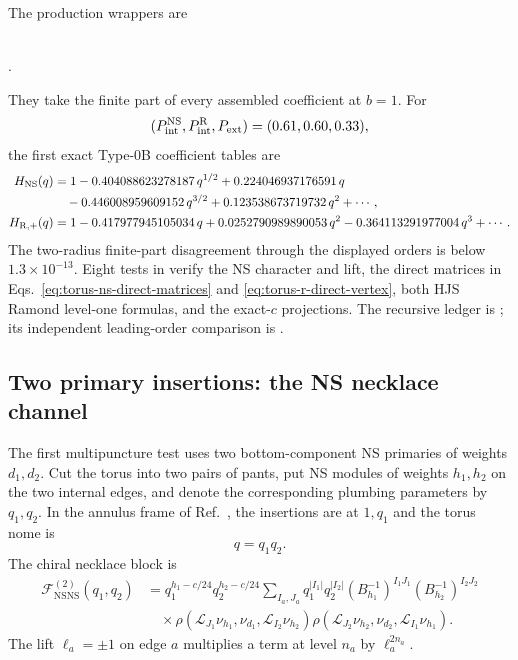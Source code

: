 \documentclass[11pt]{article}
\newcommand{\NS}{\mathrm{NS}}
\newcommand{\R}{\mathrm{R}}
\newcommand{\F}{\mathcal F}
\begin{document}
The production wrappers are
\begin{center}
\\
.
\end{center}
They take the finite part of every assembled coefficient at $b=1$.  For
\begin{equation}
 (P_{\rm int}^{\NS},P_{\rm int}^{\R},P_{\rm ext})
 =(0.61,0.60,0.33),
 \label{eq:torus-code-anchor-momenta}
\end{equation}
the first exact Type-0B coefficient tables are
\begin{align}
 H_{\NS}(q)
 &=1-0.404088623278187\,q^{1/2}
   +0.224046937176591\,q
 \notag\\
 &\quad
   -0.446008959609152\,q^{3/2}
   +0.123538673719732\,q^2+\cdots,
 \notag\\
 H_{\R,+}(q)
 &=1-0.417977945105034\,q
   +0.0252790989890053\,q^2
   -0.364113291977004\,q^3+\cdots .
 \label{eq:torus-code-anchors}
\end{align}
The two-radius finite-part disagreement through the displayed orders is
below $1.3\times10^{-13}$.  Eight tests in
 verify the NS character and lift,
the direct matrices in Eqs.~\eqref{eq:torus-ns-direct-matrices} and
\eqref{eq:torus-r-direct-vertex}, both HJS Ramond level-one formulas, and the
exact-$c$ projections.  The recursive ledger is
; its independent leading-order
comparison is .

\subsection{Two primary insertions: the NS necklace channel}
\label{sec:torus-two-point}

The first multipuncture test uses two bottom-component NS primaries of
weights $d_1,d_2$.  Cut the torus into two pairs of pants, put NS modules of
weights $h_1,h_2$ on the two internal edges, and denote the corresponding
plumbing parameters by $q_1,q_2$.  In the annulus frame of
Ref.~\cite{BelavinGeiko2018CRecursion}, the insertions are at $1,q_1$ and the
torus nome is
\begin{equation}
 q=q_1q_2.
 \label{eq:torus-two-point-modulus}
\end{equation}
The chiral necklace block is
\begin{equation}
\label{eq:torus-two-point-necklace}
\begin{aligned}
 \F_{\NS\NS}^{(2)}(q_1,q_2)
 &=q_1^{h_1-c/24}q_2^{h_2-c/24}
 \sum_{I_a,J_a}
 q_1^{|I_1|}q_2^{|I_2|}
 (B_{h_1}^{-1})^{I_1J_1}(B_{h_2}^{-1})^{I_2J_2}
 \\
 &\quad\times
 \rho(\mathcal L_{J_1}\nu_{h_1},\nu_{d_1},
             \mathcal L_{I_2}\nu_{h_2})
 \rho(\mathcal L_{J_2}\nu_{h_2},\nu_{d_2},
             \mathcal L_{I_1}\nu_{h_1}).
\end{aligned}
\end{equation}
The lift $\ell_a=\pm1$ on edge $a$ multiplies a term at level $n_a$ by
$\ell_a^{2n_a}$.
\end{document}
